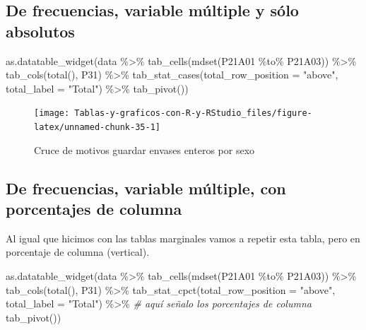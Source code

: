 \documentclass[
]{book}
\newenvironment{Shaded}{\begin{snugshade}}{\end{snugshade}}
\newcommand{\AttributeTok}[1]{\textcolor[rgb]{0.77,0.63,0.00}{#1}}
\newcommand{\CommentTok}[1]{\textcolor[rgb]{0.56,0.35,0.01}{\textit{#1}}}
\newcommand{\FunctionTok}[1]{\textcolor[rgb]{0.00,0.00,0.00}{#1}}
\newcommand{\NormalTok}[1]{#1}
\newcommand{\SpecialCharTok}[1]{\textcolor[rgb]{0.00,0.00,0.00}{#1}}
\newcommand{\StringTok}[1]{\textcolor[rgb]{0.31,0.60,0.02}{#1}}
\begin{document}
\hypertarget{de-frecuencias-variable-muxfaltiple-y-suxf3lo-absolutos}{%
\subsection{De frecuencias, variable múltiple y sólo absolutos}\label{de-frecuencias-variable-muxfaltiple-y-suxf3lo-absolutos}}

\begin{Shaded}
\begin{Highlighting}[]
\FunctionTok{as.datatable\_widget}\NormalTok{(data }\SpecialCharTok{\%\textgreater{}\%}
  \FunctionTok{tab\_cells}\NormalTok{(}\FunctionTok{mdset}\NormalTok{(P21A01 }\SpecialCharTok{\%to\%}\NormalTok{ P21A03)) }\SpecialCharTok{\%\textgreater{}\%}
  \FunctionTok{tab\_cols}\NormalTok{(}\FunctionTok{total}\NormalTok{(), P31) }\SpecialCharTok{\%\textgreater{}\%}
  \FunctionTok{tab\_stat\_cases}\NormalTok{(}\AttributeTok{total\_row\_position =} \StringTok{"above"}\NormalTok{, }\AttributeTok{total\_label =} \StringTok{"Total"}\NormalTok{) }\SpecialCharTok{\%\textgreater{}\%}
  \FunctionTok{tab\_pivot}\NormalTok{())}
\end{Highlighting}
\end{Shaded}

\begin{figure}[H]

{\centering \texttt{[image: Tablas-y-graficos-con-R-y-RStudio\_files/figure-latex/unnamed-chunk-35-1]} 

}

\caption{Cruce de motivos guardar envases enteros por sexo}\label{fig:unnamed-chunk-35}
\end{figure}

\hypertarget{de-frecuencias-variable-muxfaltiple-con-porcentajes-de-columna}{%
\subsection{De frecuencias, variable múltiple, con porcentajes de columna}\label{de-frecuencias-variable-muxfaltiple-con-porcentajes-de-columna}}

Al igual que hicimos con las tablas marginales vamos a repetir esta tabla, pero en porcentaje de columna (vertical).

\begin{Shaded}
\begin{Highlighting}[]
\FunctionTok{as.datatable\_widget}\NormalTok{(data }\SpecialCharTok{\%\textgreater{}\%}
    \FunctionTok{tab\_cells}\NormalTok{(}\FunctionTok{mdset}\NormalTok{(P21A01 }\SpecialCharTok{\%to\%}\NormalTok{ P21A03)) }\SpecialCharTok{\%\textgreater{}\%}
    \FunctionTok{tab\_cols}\NormalTok{(}\FunctionTok{total}\NormalTok{(), P31) }\SpecialCharTok{\%\textgreater{}\%}
    \FunctionTok{tab\_stat\_cpct}\NormalTok{(}\AttributeTok{total\_row\_position =} \StringTok{"above"}\NormalTok{, }\AttributeTok{total\_label =} \StringTok{"Total"}\NormalTok{) }\SpecialCharTok{\%\textgreater{}\%} \CommentTok{\# aquí señalo los porcentajes de columna}
    \FunctionTok{tab\_pivot}\NormalTok{())}
\end{Highlighting}
\end{Shaded}
\end{document}
